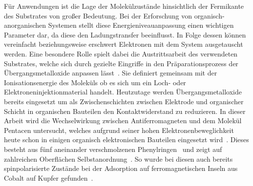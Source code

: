     Für Anwendungen ist die Lage der Molekülzustände hinsichtlich der Fermikante des Substrates von großer Bedeutung.
    Bei der Erforschung von organisch-anorganischen Systemen stellt diese Energieniveauanpassung einen wichtigen Parameter dar, da diese den Ladungstransfer beeinflusst.
    In Folge dessen können vereinfacht beziehungsweise erschwert Elektronen mit dem System ausgetauscht werden.
    Eine besondere Rolle spielt dabei die Austrittsarbeit des verwendeten Substrates, welche sich durch gezielte Eingriffe in den Präparationsprozess der Übergangsmetalloxide anpassen lässt~\cite{5A_4, 5A_3, IF_11}.
    Sie definiert gemeinsam mit der Ionisationsenergie des Moleküls ob es sich um ein Loch- oder Elektroneninjektionmaterial handelt.
    Heutzutage werden Übergangsmetalloxide bereits eingesetzt um als Zwischenschichten zwischen Elektrode und organischer Schicht in organischen Bauteilen den Kontaktwiderstand zu reduzieren.
    In dieser Arbeit wird die Wechselwirkung zwischen Antiferromagneten und dem Molekül Pentacen untersucht, welches aufgrund seiner hohen Elektronenbeweglichkeit heute schon in einigen organisch elektronischen Bauteilen eingesetzt wird~\cite{5A_4, 5A_13}.
    Dieses besteht aus fünf aneinander verschmolzenen Phenylringen~\cite{MM_2} und zeigt auf zahlreichen Oberflächen Selbstanordnung~\cite{5A_9}.
    So wurde bei diesen auch bereits spinpolarisierte Zustände bei der Adsorption auf ferromagnetischen Inseln aus Cobalt auf Kupfer gefunden~\cite{chu_spin-dependent_2015}.

